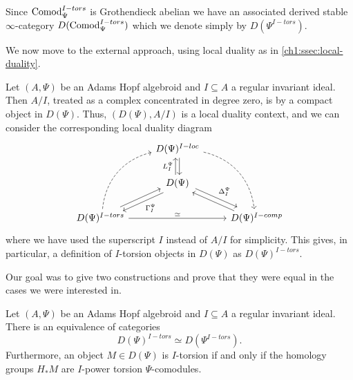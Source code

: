 \begin{notation}
    Since $\mathrm{Comod}_\Psi^{I-tors}$ is Grothendieck abelian we have an associated derived stable $\infty$-category $D(\mathrm{Comod}_\Psi^{I-tors})$ which we denote simply by $D(\Psi^{I-tors})$.
\end{notation}





We now move to the external approach, using local duality as in \cref{ch1:ssec:local-duality}. 

\begin{construction}
    \label{const:local-duality-hopf-algebroid}
    Let $(A, \Psi)$ be an Adams Hopf algebroid and $I\subseteq A$ a regular invariant ideal. Then $A/I$, treated as a complex concentrated in degree zero, is by \cite[5.13]{barthel-heard-valenzuela_2018} a compact object in $D(\Psi)$. Thus, $(D(\Psi), A/I)$ is a local duality context, and we can consider the corresponding local duality diagram
    \begin{equation*}
        \begin{tikzcd}
            & {D(\Psi)^{I-loc}} \\
            & {D(\Psi)} \\
            {D(\Psi)^{I-tors}} && {D(\Psi)^{I-comp}}
            \arrow["L_I^\Psi", xshift=-2pt, from=2-2, to=1-2]
            \arrow[xshift=2pt, from=1-2, to=2-2]
            \arrow["\Delta_I^\Psi", yshift=2pt, xshift=2pt, from=2-2, to=3-3]
            \arrow[yshift=-2pt, xshift=-1pt, from=3-3, to=2-2]
            \arrow["\Gamma^\Psi_I", yshift=-2pt, xshift=2pt, from=2-2, to=3-1]
            \arrow[yshift=2pt, xshift=-1pt, from=3-1, to=2-2]
            \arrow[bend left=35, dashed, from=3-1, to=1-2]
            \arrow[bend left=35, dashed, from=1-2, to=3-3]
            \arrow["\simeq"', swap, from=3-1, to=3-3]
        \end{tikzcd}    
    \end{equation*}
    where we have used the superscript $I$ instead of $A/I$ for simplicity. This gives, in particular, a definition of $I$-torsion objects in $D(\Psi)$ as $D(\Psi)^{I-tors}$. 
\end{construction}

Our goal was to give two constructions and prove that they were equal in the cases we were interested in. 

\begin{lemma}
    \label{lm:derived-torsion-if-homology-torsion}
    Let $(A,\Psi)$ be an Adams Hopf algebroid and $I\subseteq A$ a regular invariant ideal. There is an equivalence of categories 
    $$D(\Psi)^{I-tors}\simeq D(\Psi^{I-tors}).$$ 
    Furthermore, an object $M\in D(\Psi)$ is $I$-torsion if and only if the homology groups $H_* M$ are $I$-power torsion $\Psi$-comodules.
\end{lemma}

